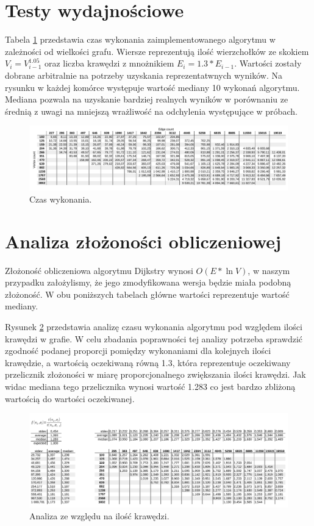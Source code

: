 \documentclass[10pt,a4paper]{article}
\begin{document}
\section{Testy wydajnościowe}
Tabela \ref{fig:time-cons} przedstawia czas wykonania zaimplementowanego algorytmu w zależności od wielkości grafu. Wiersze reprezentują ilość wierzchołków ze skokiem $V_{i} = V_{i-1}^{1.05}$ oraz liczba krawędzi z mnożnikiem $E_{i} = 1.3 * E_{i-1}$. Wartości zostały dobrane arbitralnie na potrzeby uzyskania reprezentatwnych wyników. Na rysunku w każdej komórce występuje wartość mediany 10 wykonań algorytmu. Mediana pozwala na uzyskanie bardziej realnych wyników w porównaniu ze średnią z uwagi na mniejszą wrażliwość na odchylenia występujące w próbach.

\begin{figure}[H]
	\centering
	\includegraphics[scale=0.3]{time-cons}
	\caption{Czas wykonania.\label{fig:time-cons}}
\end{figure}

\section{Analiza złożoności obliczeniowej}
Złożoność obliczeniowa algorytmu Dijkstry wynosi $O(E * \ln V)$, w naszym przypadku założylismy, że jego zmodyfikowana wersja będzie miała podobną złożoność. W obu poniższych tabelach główne wartości reprezentuje wartość mediany.

Rysunek \ref{fig:edge-element} przedstawia analizę czasu wykonania algorytmu pod względem ilości krawędzi w grafie. W celu zbadania poprawności tej analizy potrzeba sprawdzić zgodność podanej proporcji pomiędzy wykonaniami dla kolejnych ilości krawędzie, a wartością oczekiwaną równą 1.3, która reprezentuje oczekiwany przelicznik złożoności w miarę proporcjonalnego zwiększania ilości krawędzi. Jak widac mediana tego przelicznika wynosi wartość 1.283 co jest bardzo zbliżoną wartością do wartości oczekiwanej.

\begin{figure}[H]
	\centering
	\includegraphics[scale=0.3]{edge-element}
	\caption{Analiza ze względu na ilość krawędzi.
			\label{fig:edge-element}}
\end{figure}
\end{document}
